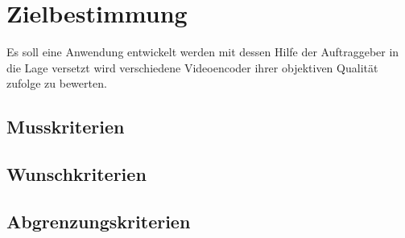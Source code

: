 \chapter{Zielbestimmung}
Es soll eine Anwendung entwickelt werden mit dessen Hilfe der Auftraggeber in die Lage versetzt wird verschiedene Videoencoder ihrer objektiven Qualität zufolge zu bewerten.
\section{Musskriterien}
\section{Wunschkriterien}
\section{Abgrenzungskriterien}
